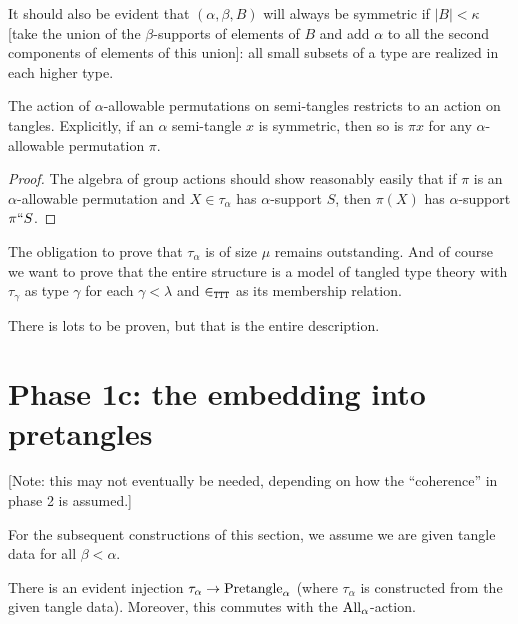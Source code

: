 \begin{lemma}
\label {lem:small-subsets-closure}
\leanok
It should also be evident that $(\alpha,\beta,B)$ will always be symmetric if $|B|<\kappa$ [take the union of the $\beta$-supports of elements of $B$ and add $\alpha$ to all the second components of elements of this union]:  all small subsets of a type are realized in each higher type.
\end{lemma}

\begin{lemma}
  \label{lem:tangle-action}
  \leanok
  The action of $\alpha$-allowable permutations on semi-tangles restricts to an action on tangles.  Explicitly, if an $\alpha$ semi-tangle $x$ is symmetric, then so is $\pi x$ for any $\alpha$-allowable permutation $\pi$.
\end{lemma}
\begin{proof}
  The algebra of group actions should show reasonably easily that if $\pi$ is an $\alpha$-allowable permutation and $X \in \tau_\alpha$ has $\alpha$-support $S$, then $\pi(X)$ has $\alpha$-support $\pi``S$.
\end{proof}

The obligation to prove that $\tau_\alpha$ is of size $\mu$ remains outstanding.  And of course we want to prove that the entire structure is a model of tangled type theory with $\tau_\gamma$ as type $\gamma$ for each $\gamma<\lambda$ and $\in_{\tt TTT}$ as its membership relation.

There is lots to be proven, but that is the entire description.

\section{Phase 1c: the embedding into pretangles}

[Note: this may not eventually be needed, depending on how the “coherence” in phase 2 is assumed.]

For the subsequent constructions of this section, we assume we are given tangle data for all $\beta < \alpha$.

\begin{definition}
  \label{def:embedding-into-pretangles}
  \leanok
  There is an evident injection $\tau_\alpha \to \mathrm{Pretangle}_\alpha$ (where $\tau_\alpha$ is constructed from the given tangle data).  Moreover, this commutes with the $\mathrm{All}_\alpha$-action.
\end{definition}

